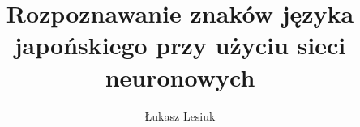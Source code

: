 \documentclass[a4paper,12pt,twoside]{book}
\author{Łukasz Lesiuk}
\title{Rozpoznawanie znaków języka japońskiego przy użyciu sieci neuronowych}
\begin{document}
\frontmatter

\tableofcontents

\mainmatter
\pagestyle{headings}









\appendix
\renewcommand{\chaptermark}[1]{%
\markboth{\MakeUppercase{%
DODATEK \thechapter.%
\ }}{}}

\end{document}
